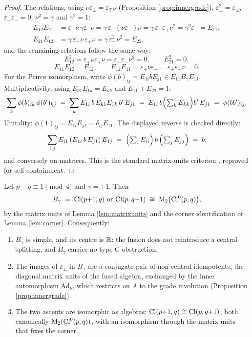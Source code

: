 \begin{proof}
The relations, using $\nu \varepsilon_\pm = \varepsilon_\mp \nu$ (Proposition \ref{prop:innergrade}), $\varepsilon_\pm^2 = \varepsilon_\pm$, $\varepsilon_+\varepsilon_- = 0$, $\nu^2 = \gamma$ and $\gamma^2 = 1$:
\begin{align*}
E_{12}E_{21} &= \varepsilon_+ \nu\, \gamma \varepsilon_- \nu = \gamma\, \varepsilon_+ (\nu \varepsilon_-) \nu = \gamma\, \varepsilon_+ \varepsilon_+ \nu^2 = \gamma^2 \varepsilon_+ = E_{11},\\
E_{21}E_{12} &= \gamma\, \varepsilon_- \nu\, \varepsilon_+ \nu = \gamma\, \varepsilon_-^2 \nu^2 = E_{22},
\end{align*}
and the remaining relations follow the same way:
\[
E_{12}^2 = \varepsilon_+ \nu \varepsilon_+ \nu = \varepsilon_+ \varepsilon_- \nu^2 = 0, \qquad E_{21}^2 = 0,
\]
\[
E_{11}E_{12} = E_{12}, \qquad
E_{12}E_{11} = \varepsilon_+ \nu \varepsilon_+ = \varepsilon_+\varepsilon_-\nu = 0 .
\] For the Peirce isomorphism, write $\phi(b)_{ij} = E_{1i} b E_{j1} \in E_{11} B_\gamma E_{11}$. Multiplicativity, using $E_{k1}E_{1k} = E_{kk}$ and $E_{11} + E_{22} = 1$:
\[
\sum_k \phi(b)_{ik}\,\phi(b')_{kj}
\;=\; \sum_k E_{1i}\, b\, E_{k1}E_{1k}\, b'\, E_{j1}
\;=\; E_{1i}\, b \Bigl(\textstyle\sum_k E_{kk}\Bigr) b'\, E_{j1}
\;=\; \phi(bb')_{ij} .
\]
Unitality: $\phi(1)_{ij} = E_{1i}E_{j1} = \delta_{ij} E_{11}$. The displayed inverse is checked directly:
\[
\sum_{i,j} E_{i1}\, (E_{1i}\, b\, E_{j1})\, E_{1j} \;=\; \Bigl(\textstyle\sum_i E_{ii}\Bigr)\, b\, \Bigl(\textstyle\sum_j E_{jj}\Bigr) \;=\; b ,
\]
and conversely on matrices. This is the standard matrix-units criterion \cite{LamFC2001}, reproved for self-containment.
\end{proof}

\begin{theorem}\label{thm:fusion}
Let $p - q \equiv 1 \pmod 4$ and $\gamma = \pm 1$. Then
\[
B_\gamma \;=\; \Cl(p{+}1,q) \ \text{or}\ \Cl(p,q{+}1) \;\cong\; \Mat_2\bigl(\Cl^0(p,q)\bigr),
\]
by the matrix units of Lemma \ref{lem:matrixunits} and the corner identification of Lemma \ref{lem:corner}. Consequently:
\begin{enumerate}
\item $B_\gamma$ is simple, and its centre is $\mathbb{R}$: the fusion does not reintroduce a central splitting, and $B_\gamma$ carries no type-C obstruction.
\item The images of $\varepsilon_\pm$ in $B_\gamma$ are a conjugate pair of non-central idempotents, the diagonal matrix units of the fused algebra, exchanged by the inner automorphism $\mathrm{Ad}_\nu$, which restricts on $A$ to the grade involution (Proposition \ref{prop:innergrade}).
\item The two ascents are isomorphic as algebras: $\mathrm{Cl}(p{+}1,q) \cong \mathrm{Cl}(p,q{+}1)$, both canonically $\mathrm{M}_2(\mathrm{Cl}^0(p,q))$, with an isomorphism through the matrix units that fixes the corner.
\end{enumerate}
\end{theorem}


